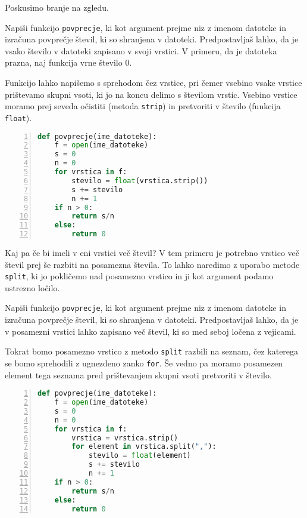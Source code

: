 Poskusimo branje na zgledu.
\begin{zgled}
Napiši funkcijo \texttt{povprecje}, ki kot argument prejme niz z imenom datoteke in izračuna povprečje števil, ki so shranjena v datoteki. Predpostavljaš lahko, da je vsako število v datoteki zapisano v svoji vrstici. V primeru, da je datoteka prazna, naj funkcija vrne število 0.
\end{zgled}
\begin{resitev}
Funkcijo lahko napišemo s sprehodom čez vrstice, pri čemer vsebino vsake vrstice prištevamo skupni vsoti, ki jo na koncu delimo s številom vrstic. Vsebino vrstice moramo prej seveda očistiti (metoda \texttt{strip}) in pretvoriti v število (funkcija \texttt{float}). 
\begin{lstlisting}[language=Python, showstringspaces=false,numbers=left]
def povprecje(ime_datoteke):
    f = open(ime_datoteke)
    s = 0
    n = 0
    for vrstica in f:
        stevilo = float(vrstica.strip())
        s += stevilo
        n += 1
    if n > 0:
        return s/n
    else:
        return 0
\end{lstlisting}
\end{resitev}

Kaj pa če bi imeli v eni vrstici več števil? V tem primeru je potrebno vrstico več števil prej še razbiti na posamezna števila. To lahko naredimo z uporabo metode \texttt{split}, ki jo pokličemo nad posamezno vrstico in ji kot argument podamo ustrezno ločilo.

\begin{zgled}
Napiši funkcijo \texttt{povprecje}, ki kot argument prejme niz z imenom datoteke in izračuna povprečje števil, ki so shranjena v datoteki. Predpostavljaš lahko, da je v posamezni vrstici lahko zapisano več števil, ki so med seboj ločena z vejicami.
\end{zgled}
\begin{resitev}
Tokrat bomo posamezno vrstico z metodo \texttt{split} razbili na seznam, čez katerega se bomo sprehodili z ugnezdeno zanko \texttt{for}. Še vedno pa moramo posamezen element tega seznama pred prištevanjem skupni vsoti pretvoriti v število.
\begin{lstlisting}[language=Python, showstringspaces=false,numbers=left]
def povprecje(ime_datoteke):
    f = open(ime_datoteke)
    s = 0
    n = 0
    for vrstica in f:
        vrstica = vrstica.strip()
        for element in vrstica.split(","):
            stevilo = float(element)
            s += stevilo    
            n += 1
    if n > 0:
        return s/n
    else:
        return 0
\end{lstlisting}
\end{resitev}

